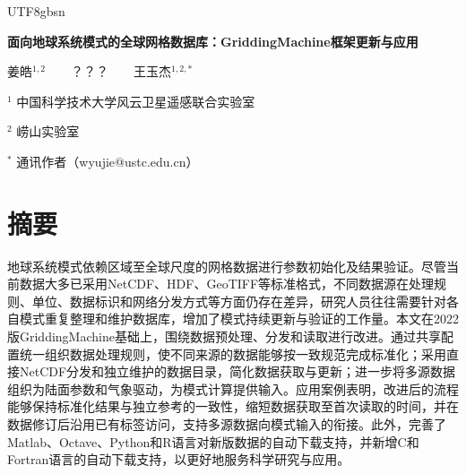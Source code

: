 \documentclass{chinese}
\begin{document}
\doublespacing
\begin{CJK}{UTF8}{gbsn}
%
%
{
\centering
\Large
\par \noindent \Large \textbf{面向地球系统模式的全球网格数据库：GriddingMachine框架更新与应用}

\normalsize
\par \noindent 姜皓$^{1,2}$\ \ \ \ ？？？\ \ \ \ 王玉杰$^{1,2,*}$
\par \noindent $^1$ 中国科学技术大学风云卫星遥感联合实验室
\par \noindent $^2$ 崂山实验室
\par \noindent $^*$ 通讯作者（wyujie@ustc.edu.cn）\\
}


%
%
\section*{摘要}
地球系统模式依赖区域至全球尺度的网格数据进行参数初始化及结果验证。尽管当前数据大多已采用NetCDF、HDF、GeoTIFF等标准格式，不同数据源在处理规则、单位、数据标识和网络分发方式等方面仍存在差异，研究人员往往需要针对各自模式重复整理和维护数据库，增加了模式持续更新与验证的工作量。本文在2022版GriddingMachine基础上，围绕数据预处理、分发和读取进行改进。通过共享配置统一组织数据处理规则，使不同来源的数据能够按一致规范完成标准化；采用直接NetCDF分发和独立维护的数据目录，简化数据获取与更新；进一步将多源数据组织为陆面参数和气象驱动，为模式计算提供输入。应用案例表明，改进后的流程能够保持标准化结果与独立参考的一致性，缩短数据获取至首次读取的时间，并在数据修订后沿用已有标签访问，支持多源数据向模式输入的衔接。此外，完善了Matlab、Octave、Python和R语言对新版数据的自动下载支持，并新增C和Fortran语言的自动下载支持，以更好地服务科学研究与应用。



\end{CJK}
\end{document}
